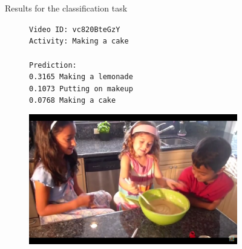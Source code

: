 \begin{figure}[H]
\caption{Results for the classification task}
\label{fig:results_visualization_classification_annex_1}
\end{figure}

\begin{figure}[H]
\centering
\begin{subfigure}[b]{.4\textwidth}
  \texttt{Video ID: vc820BteGzY \\
    Activity: Making a cake \\
    \\
    Prediction: \\
    0.3165	Making a lemonade \\
    0.1073	Putting on makeup \\
    0.0768	Making a cake \\}
\end{subfigure}%
\begin{subfigure}[b]{.6\textwidth}
  \centering
\includegraphics[width=0.95\linewidth]{img/results/activity_classification/results_visualization_classification_9}
\end{subfigure}


\end{figure}
